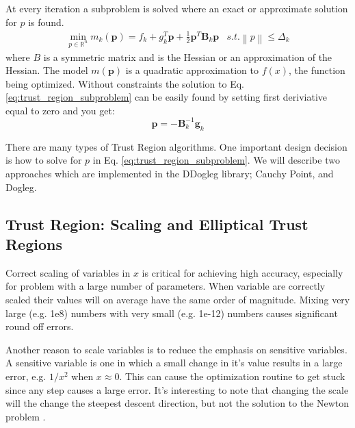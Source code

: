 \documentclass[peerreview,onecolumn]{IEEEtran}
\newcommand{\R}{\mathbb{R}}
\newcommand{\norm}[1]{\left\lVert#1\right\rVert}
\begin{document}
At every iteration a subproblem is solved where an exact or approximate solution for $p$ is found.
\begin{equation}
\begin{array}{lr}
\min\limits_{p\in \R^n} m_k(\bm{p}) = f_k + g^T_k \bm{p} + \frac{1}{2}\bm{p}^T \bm{B}_k \bm{p} & s.t. \norm{p} \le \Delta_k
\end{array}
\label{eq:trust_region_subproblem}
\end{equation}
where $B$ is a symmetric matrix and is the Hessian or an approximation of the Hessian. The model $m(\bm{p})$ is a quadratic approximation to $f(x)$, the function being optimized. Without constraints  the solution to Eq. \ref{eq:trust_region_subproblem} can be easily found by setting first deriviative equal to zero and you get:
\begin{equation}
\bm{p} = -\bm{B}^{-1}_k \bm{g}_k
\label{eq:TR_unconstrained_solution}
\end{equation}

There are many types of Trust Region algorithms. One important design decision is how to solve for $p$ in Eq. \ref{eq:trust_region_subproblem}. We will describe two approaches which are implemented in the DDogleg library; Cauchy Point, and Dogleg.

\subsection{Trust Region: Scaling and Elliptical Trust Regions} 

Correct scaling of variables in $x$ is critical for achieving high accuracy, especially for problem with a large number of parameters. When variable are correctly scaled their values will on average have the same order of magnitude. Mixing very large (e.g. 1e8) numbers with very small (e.g. 1e-12) numbers causes significant round off errors. 

Another reason to scale variables is to reduce the emphasis on sensitive variables. A sensitive variable is one in which a small change in it's value results in a large error, e.g. $1/x^2$ when $x \approx 0$. This can cause the optimization routine to get stuck since any step causes a large error. It's interesting to note that changing the scale will the change the steepest descent direction, but not the solution to the Newton problem \cite{dennis1996}. 
\end{document}
